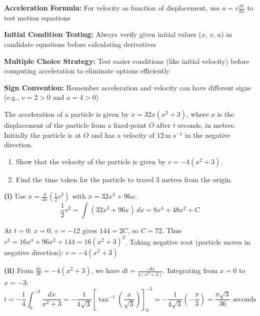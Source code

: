 \begin{takeaways}
\item \textbf{Acceleration Formula:} For velocity as function of displacement, use $a = v\frac{dv}{dx}$ to test motion equations
\item \textbf{Initial Condition Testing:} Always verify given initial values ($x$, $v$, $a$) in candidate equations before calculating derivatives
\item \textbf{Multiple Choice Strategy:} Test easier conditions (like initial velocity) before computing acceleration to eliminate options efficiently
\item \textbf{Sign Convention:} Remember acceleration and velocity can have different signs (e.g., $v=2 > 0$ and $a=4 > 0$)
\end{takeaways}

\newpage

\begin{problem}
The acceleration of a particle is given by $\ddot{x} = 32x(x^2 + 3)$, where $x$ is the displacement of the particle from a fixed-point $O$ after $t$ seconds, in metres. Initially the particle is at $O$ and has a velocity of $12 \, \text{m s}^{-1}$ in the negative direction.

\begin{enumerate}
    \item[(i)] Show that the velocity of the particle is given by $v = -4(x^2 + 3)$.
    \item[(ii)] Find the time taken for the particle to travel $3$ metres from the origin.
\end{enumerate}
\end{problem}

\begin{solution}
\textbf{(i)} Use $\ddot{x} = \frac{d}{dx}\left(\frac{1}{2}v^2\right)$ with $\ddot{x} = 32x^3 + 96x$:
\[ \frac{1}{2}v^2 = \int (32x^3 + 96x) \, dx = 8x^4 + 48x^2 + C \]

At $t=0$: $x=0$, $v = -12$ gives $144 = 2C$, so $C = 72$. Thus $v^2 = 16x^4 + 96x^2 + 144 = 16(x^2 + 3)^2$. Taking negative root (particle moves in negative direction): $\boxed{v = -4(x^2 + 3)}$

\textbf{(ii)} From $\frac{dx}{dt} = -4(x^2 + 3)$, we have $dt = \frac{-dx}{4(x^2 + 3)}$. Integrating from $x = 0$ to $x = -3$:
\[ t = -\frac{1}{4} \int_{0}^{-3} \frac{dx}{x^2 + 3} = -\frac{1}{4\sqrt{3}} \left[ \tan^{-1}\left(\frac{x}{\sqrt{3}}\right) \right]_{0}^{-3} = -\frac{1}{4\sqrt{3}} \left( -\frac{\pi}{3} \right) = \frac{\pi\sqrt{3}}{36} \text{ seconds} \]
\end{solution}

